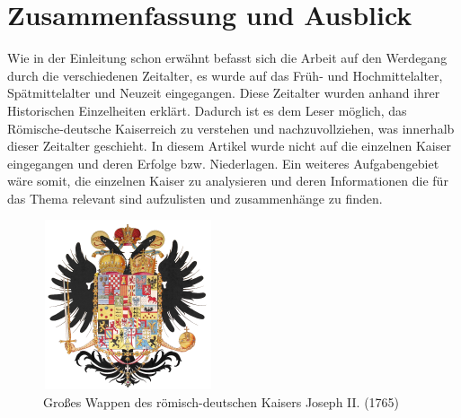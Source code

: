 
\chapter{Zusammenfassung und Ausblick}
\label{chapter-fazit}

Wie in der Einleitung schon erwähnt befasst sich die Arbeit auf den Werdegang durch die verschiedenen Zeitalter, es wurde auf das Früh- und Hochmittelalter, Spätmittelalter und Neuzeit eingegangen. Diese Zeitalter wurden anhand ihrer Historischen Einzelheiten erklärt. Dadurch ist es dem Leser möglich, das Römische-deutsche Kaiserreich zu verstehen und nachzuvollziehen, was innerhalb dieser Zeitalter geschieht.
In diesem Artikel wurde nicht auf die einzelnen Kaiser eingegangen und deren Erfolge bzw. Niederlagen. Ein weiteres Aufgabengebiet wäre somit, die einzelnen Kaiser zu analysieren und deren Informationen die für das Thema relevant sind aufzulisten und zusammenhänge zu finden.
\cite{Schulze}
\begin{figure}[h]
\centering
\includegraphics[width = 5cm, height= 5cm]{GrossesWappen.png}
\caption{Großes Wappen des römisch-deutschen Kaisers Joseph II. (1765)}
\end{figure}